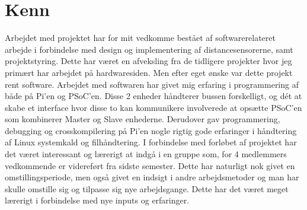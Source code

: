 \section{Kenn}\label{sec:opnaaede_erfaringer_ke}

Arbejdet med projektet har for mit vedkomme bestået af softwarerelateret arbejde i forbindelse med design og implementering af distancesensorerne, samt projektstyring. 
Dette har været en afveksling fra de tidligere projekter hvor jeg primært har arbejdet på hardwaresiden. 
Men efter eget ønske var dette projekt rent software.
Arbejdet med softwaren har givet mig erfaring i programmering af \IIC både på Pi'en og PSoC'en. 
Disse 2 enheder håndterer bussen forskelligt, og dét at skabe et interface hvor disse to kan kommunikere involverede at opsætte PSoC'en som kombinerer Master og Slave enhederne. Derudover gav programmering, debugging og crosskompilering på Pi'en nogle rigtig gode erfaringer i håndtering af Linux systemkald og filhåndtering.
I forbindelse med forløbet af projektet har det været interessant og lærerigt at indgå i en gruppe som, for 4 medlemmers vedkommende er videreført fra sidste semester. 
Dette har naturligt nok givet en omstillingsperiode, men også givet en indsigt i andre arbejdsmetoder og man har skulle omstille sig og tilpasse sig nye arbejdsgange. 
Dette har det været meget lærerigt i forbindelse med nye inputs og erfaringer. 